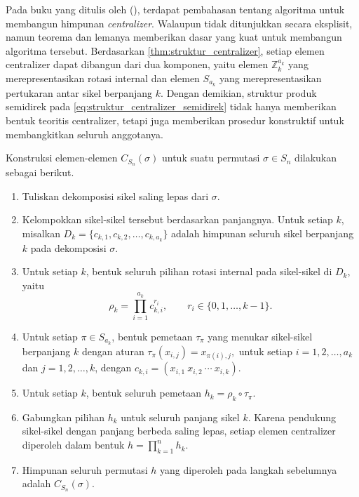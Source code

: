 Pada buku yang ditulis oleh \citeauthor{seress2003permutation} (\citeyear{seress2003permutation}), terdapat pembahasan tentang algoritma untuk membangun himpunan \emph{centralizer}. Walaupun tidak ditunjukkan secara eksplisit, namun teorema dan lemanya memberikan dasar yang kuat untuk membangun algoritma tersebut. Berdasarkan \autoref{thm:struktur_centralizer}, setiap elemen centralizer dapat dibangun dari dua komponen, yaitu elemen $\mathbb{Z}_k^{a_k}$ yang merepresentasikan rotasi internal dan elemen $S_{a_k}$ yang merepresentasikan pertukaran antar sikel berpanjang $k$. Dengan demikian, struktur produk semidirek pada \eqref{eq:struktur_centralizer_semidirek} tidak hanya memberikan bentuk teoritis centralizer, tetapi juga memberikan prosedur konstruktif untuk membangkitkan seluruh anggotanya.
\begin{algoritma}\label{alg:konstruksi_centralizer}
  Konstruksi elemen-elemen $C_{S_n}(\sigma)$ untuk suatu permutasi $\sigma\in S_n$ dilakukan sebagai berikut.
  \begin{enumerate}
    \item Tuliskan dekomposisi sikel saling lepas dari $\sigma$.

    \item Kelompokkan sikel-sikel tersebut berdasarkan panjangnya. Untuk setiap $k$, misalkan
          $
            D_k=\{c_{k,1},c_{k,2},\ldots,c_{k,a_k}\}
          $
          adalah himpunan seluruh sikel berpanjang $k$ pada dekomposisi $\sigma$.

    \item Untuk setiap $k$, bentuk seluruh pilihan rotasi internal pada sikel-sikel di $D_k$, yaitu
          \[
            \rho_k
            =
            \prod_{i=1}^{a_k} c_{k,i}^{r_i},
            \qquad
            r_i\in\{0,1,\ldots,k-1\}.
          \]

    \item Untuk setiap $\pi\in S_{a_k}$, bentuk pemetaan $\tau_\pi$ yang menukar sikel-sikel berpanjang $k$ dengan aturan
          $
            \tau_\pi(x_{i,j})=x_{\pi(i),j},
          $
          untuk setiap $i=1,2,\ldots,a_k$ dan $j=1,2,\ldots,k$, dengan
          $
            c_{k,i}=(x_{i,1}\ x_{i,2}\ \cdots\ x_{i,k}).
          $

    \item Untuk setiap $k$, bentuk seluruh pemetaan
          $
            h_k=\rho_k\circ\tau_\pi.
          $

    \item Gabungkan pilihan $h_k$ untuk seluruh panjang sikel $k$. Karena pendukung sikel-sikel dengan panjang berbeda saling lepas, setiap elemen centralizer diperoleh dalam bentuk
          $
            h=\prod_{k=1}^{n} h_k.
          $

    \item Himpunan seluruh permutasi $h$ yang diperoleh pada langkah sebelumnya adalah
          $
            C_{S_n}(\sigma).
          $
  \end{enumerate}
\end{algoritma}

